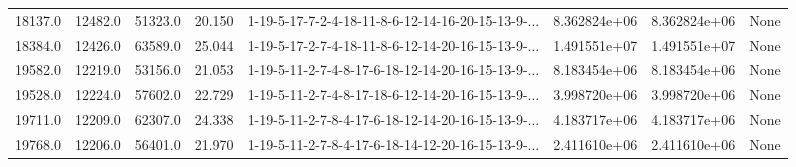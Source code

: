 \begin{tabular}{rrrrlrrl}
 18137.0 &  12482.0 &        51323.0 &             20.150 &  1-19-5-17-7-2-4-18-11-8-6-12-14-16-20-15-13-9-... &  8.362824e+06 &  8.362824e+06 &   None \\
 18384.0 &  12426.0 &        63589.0 &             25.044 &  1-19-5-17-2-7-4-18-11-8-6-12-14-20-16-15-13-9-... &  1.491551e+07 &  1.491551e+07 &   None \\
 19582.0 &  12219.0 &        53156.0 &             21.053 &  1-19-5-11-2-7-4-8-17-6-18-12-14-20-16-15-13-9-... &  8.183454e+06 &  8.183454e+06 &   None \\
 19528.0 &  12224.0 &        57602.0 &             22.729 &  1-19-5-11-2-7-4-8-17-18-6-12-14-20-16-15-13-9-... &  3.998720e+06 &  3.998720e+06 &   None \\
 19711.0 &  12209.0 &        62307.0 &             24.338 &  1-19-5-11-2-7-8-4-17-6-18-12-14-20-16-15-13-9-... &  4.183717e+06 &  4.183717e+06 &   None \\
 19768.0 &  12206.0 &        56401.0 &             21.970 &  1-19-5-11-2-7-8-4-17-6-18-14-12-20-16-15-13-9-... &  2.411610e+06 &  2.411610e+06 &   None \\
\bottomrule
\end{tabular}
